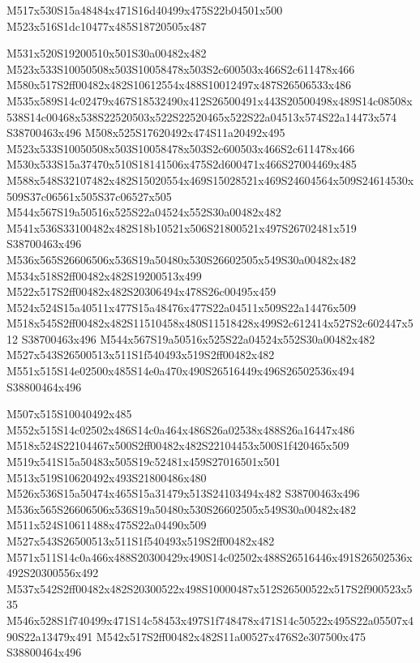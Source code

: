 \documentclass{article}
\begin{document}
\begin{multicols}{2}
\begin{center}
M517x530S15a48484x471S16d40499x475S22b04501x500 M523x516S1dc10477x485S18720505x487 
\end{center}


M531x520S19200510x501S30a00482x482 M523x533S10050508x503S10058478x503S2c600503x466S2c611478x466 M580x517S2ff00482x482S10612554x488S10012497x487S26506533x486 M535x589S14c02479x467S18532490x412S26500491x443S20500498x489S14c08508x538S14c00468x538S22520503x522S22520465x522S22a04513x574S22a14473x574 S38700463x496 M508x525S17620492x474S11a20492x495 M523x533S10050508x503S10058478x503S2c600503x466S2c611478x466 M530x533S15a37470x510S18141506x475S2d600471x466S27004469x485 M588x548S32107482x482S15020554x469S15028521x469S24604564x509S24614530x509S37c06561x505S37c06527x505 M544x567S19a50516x525S22a04524x552S30a00482x482 M541x536S33100482x482S18b10521x506S21800521x497S26702481x519 S38700463x496 M536x565S26606506x536S19a50480x530S26602505x549S30a00482x482 M534x518S2ff00482x482S19200513x499 M522x517S2ff00482x482S20306494x478S26c00495x459 M524x524S15a40511x477S15a48476x477S22a04511x509S22a14476x509 M518x545S2ff00482x482S11510458x480S11518428x499S2c612414x527S2c602447x512 S38700463x496 M544x567S19a50516x525S22a04524x552S30a00482x482 M527x543S26500513x511S1f540493x519S2ff00482x482 M551x515S14e02500x485S14e0a470x490S26516449x496S26502536x494 S38800464x496

M507x515S10040492x485 M552x515S14c02502x486S14c0a464x486S26a02538x488S26a16447x486 M518x524S22104467x500S2ff00482x482S22104453x500S1f420465x509 M519x541S15a50483x505S19c52481x459S27016501x501 M513x519S10620492x493S21800486x480 M526x536S15a50474x465S15a31479x513S24103494x482 S38700463x496 M536x565S26606506x536S19a50480x530S26602505x549S30a00482x482 M511x524S10611488x475S22a04490x509 M527x543S26500513x511S1f540493x519S2ff00482x482 M571x511S14c0a466x488S20300429x490S14c02502x488S26516446x491S26502536x492S20300556x492 M537x542S2ff00482x482S20300522x498S10000487x512S26500522x517S2f900523x535 M546x528S1f740499x471S14c58453x497S1f748478x471S14c50522x495S22a05507x490S22a13479x491 M542x517S2ff00482x482S11a00527x476S2e307500x475 S38800464x496


\end{multicols}
\end{document}
